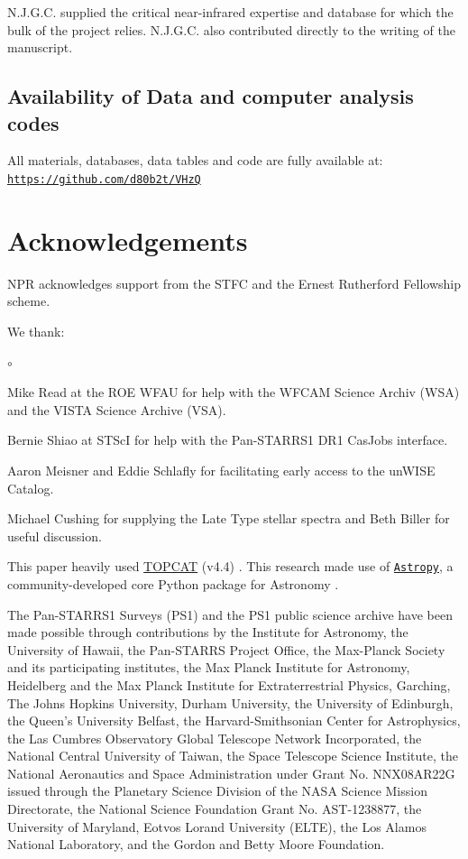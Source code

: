 \documentclass[usenatbib]{mnras}
\begin{document}
N.J.G.C. supplied the critical near-infrared expertise and database for which the bulk of the project relies. N.J.G.C. also contributed directly to the writing of the manuscript.



\subsection*{Availability of Data and computer analysis codes} 
All materials, databases, data tables and code are fully available at: 
\href{https://github.com/d80b2t/VHzQ}{\tt https://github.com/d80b2t/VHzQ}


\section*{Acknowledgements}
NPR acknowledges support from the STFC and the Ernest Rutherford Fellowship scheme. 

We thank:
\begin{list}{$\circ$}{}  
\item Mike Read at the ROE WFAU for help with the WFCAM Science Archiv (WSA) and the VISTA Science Archive (VSA). 
\item Bernie Shiao at STScI for help with the Pan-STARRS1 DR1 CasJobs interface. 
\item Aaron Meisner and Eddie Schlafly for facilitating early access to the unWISE Catalog. 
\item Michael Cushing for supplying the Late Type stellar spectra and Beth Biller for useful discussion. 
\end{list}


This paper heavily used \href{http://www.star.bris.ac.uk/~mbt/topcat/}{TOPCAT} (v4.4)
\citep[][]{Taylor2005, Taylor2011}.
This research made use of \href{http://www.astropy.org}{\tt Astropy}, 
a community-developed core Python package for Astronomy 
\citep{AstropyCollaboration2013, AstropyCollaboration2018}. 

The Pan-STARRS1 Surveys (PS1) and the PS1 public science archive have
been made possible through contributions by the Institute for
Astronomy, the University of Hawaii, the Pan-STARRS Project Office,
the Max-Planck Society and its participating institutes, the Max
Planck Institute for Astronomy, Heidelberg and the Max Planck
Institute for Extraterrestrial Physics, Garching, The Johns Hopkins
University, Durham University, the University of Edinburgh, the
Queen's University Belfast, the Harvard-Smithsonian Center for
Astrophysics, the Las Cumbres Observatory Global Telescope Network
Incorporated, the National Central University of Taiwan, the Space
Telescope Science Institute, the National Aeronautics and Space
Administration under Grant No. NNX08AR22G issued through the Planetary
Science Division of the NASA Science Mission Directorate, the National
Science Foundation Grant No. AST-1238877, the University of Maryland,
Eotvos Lorand University (ELTE), the Los Alamos National Laboratory,
and the Gordon and Betty Moore Foundation.
\end{document}
